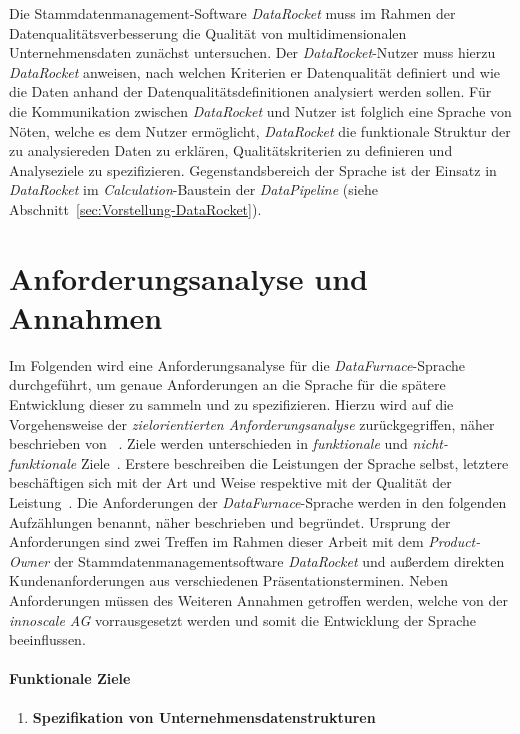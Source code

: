 \documentclass[
  language=german, %
  type=bachelor,%
  ngerman
]{isthesis}
\begin{document}
\begin{content}
  Die Stammdatenmanagement-Software \textit{DataRocket} muss im Rahmen der
  Datenqualitätsver\-besserung die Qualität von multidimensionalen
  Unternehmensdaten zunächst untersuchen. Der \textit{DataRocket}-Nutzer muss
  hierzu \textit{DataRocket} anweisen, nach welchen Kriterien er
  Datenqualität definiert und wie die Daten anhand der
  Datenqualitätsdefinitionen analysiert werden sollen. Für die Kommunikation
  zwischen \textit{DataRocket} und Nutzer ist folglich eine Sprache von Nöten,
  welche es dem Nutzer ermöglicht, \textit{DataRocket} die funktionale Struktur
  der zu analysiereden Daten zu erklären, Qualitätskriterien zu definieren und
  Analyseziele zu spezifizieren.  Gegenstandsbe\-reich der Sprache ist der
  Einsatz in \textit{DataRocket} im \textit{Calculation}-Baustein der
  \textit{DataPipeline} (siehe Abschnitt~\ref{sec:Vorstellung-DataRocket}).


  \section{Anforderungsanalyse und Annahmen}\label{sec:sprache/anforderungsanalyse}

  Im Folgenden wird eine Anforderungsanalyse für die
  \textit{DataFurnace}-Sprache durchgeführt, um genaue Anforderungen an die
  Sprache für die spätere Entwicklung dieser zu sammeln und zu spezifizieren.
  Hierzu wird auf die Vorgehensweise der \textit{zielorientierten
  Anforderungsanalyse} zurückgegriffen, näher beschrieben von
  \textsc{\citeauthor{van2001goal}}~\citeyearpar{van2001goal}.  Ziele werden
  unterschieden in \textit{funktionale} und \textit{nicht-funktionale}
  Ziele~\cite[][S.  36]{mylopoulos1999object}.  Erstere beschreiben die
  Leistungen der Sprache selbst, letztere beschäftigen sich mit der Art und
  Weise respektive mit der Qualität der Leistung~\cite[][S.  250]{van2001goal}.
  Die Anforderungen der \textit{DataFurnace}-Sprache werden in den folgenden
  Aufzählungen benannt, näher beschrieben und begründet. Ursprung der
  Anforderungen sind zwei Treffen im Rahmen dieser Arbeit mit dem
  \textit{Product-Owner} der Stammdatenmanagementsoftware \textit{DataRocket}
  und außerdem direkten Kundenanforderungen aus verschiedenen
  Präsentationsterminen.  Neben Anforderungen müssen des Weiteren Annahmen
  getroffen werden, welche von der \textit{innoscale AG} vorrausgesetzt werden
  und somit die Entwicklung der Sprache beeinflussen.


  \paragraph{Funktionale Ziele}
    \begin{enumerate}
      \item \textbf{Spezifikation von Unternehmensdatenstrukturen}\label{item:spezifikation-von-unternehmensdatenstrukturen}


\end{enumerate}
\end{content}
\end{document}
